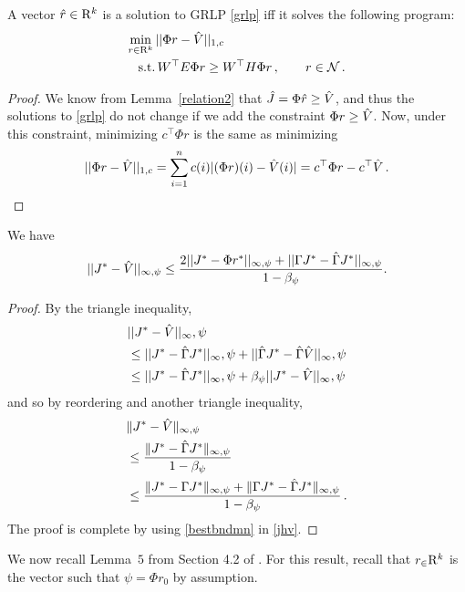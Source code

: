 \begin{lemma}\label{srw}
A vector
$\hat{r} \in \mathrm{R}^k$ is a solution to GRLP \eqref{grlp} iff it solves the following program:
\begin{align}\label{grlpeqprog}
\begin{split}
\min_{r\in \R^k}\, &||\Phi r-\hv||_{1,c}\\
\text{s.t.}\mb &\, W^\top E \Phi r\geq W^\top H \Phi r\,, \qquad r\in \N\,.
\end{split}
\end{align}
\end{lemma}
\begin{proof}
We know from Lemma~\ref{relation2} that $\hat{J} = \Phi \hat{r} \geq\hat{V}$, and thus
the solutions to \eqref{grlp} do not change if we add the constraint $\Phi r \ge \hat{V}$.
Now, under this constraint, minimizing $c^\top \Phi r$ is the same as minimizing 
\begin{align*}
||\Phi r-\hat{V}||_{1,c}=\sum_{i=1}^n c(i) |(\Phi r)(i)-\hat{V}(i)|=c^\top \Phi r-c^\top \hat{V}\,.
\end{align*} 
\end{proof}
\begin{lemma}\label{cmt1mn}
We have
\begin{align}
||J^*-\hat{V}||_{\infty,\psi}\leq \frac{2||J^*-\Phi r^*||_{\infty,\psi}+||\Gamma J^*-\hat{\Gamma} J^*||_{\infty,\psi}}{1-\beta_{\psi}}.
\end{align}
\end{lemma}
\begin{proof}
By the triangle inequality,
\begin{align*}
&||J^*-\hat{V}||_\infty,\psi\\&\leq ||J^*-\hat{\Gamma} J^*||_\infty,\psi+||\hat{\Gamma} J^*-\hat{\Gamma} \hat{V}||_\infty,\psi\\&\leq ||J^*-\hat{\Gamma} J^*||_\infty,\psi+\beta_\psi || J^*- \hat{V}||_\infty,\psi
\end{align*}
and so by reordering and another triangle inequality,
\begin{align}\label{jhv}
&\norm{J^*-\hv}_{\mn} \\&\le \frac{\norm{ J^*-\hg J^*}_{\mn}}{1-\beta_\psi}\\
&\le \frac{\norm{ J^*-\Gamma J^*}_{\mn}+\norm{\Gamma J^* - \hg J^*}_{\mn}}{1-\beta_\psi}\,.
\end{align}
The proof is complete by using \cref{bestbndmn} in \eqref{jhv}.
\end{proof}
We now recall Lemma~$5$ from Section 4.2 of \cite{ALP}. 
For this result, recall that $r_\in \mathrm{R}^k$ is the vector such that $\psi = \Phi r_0$ by assumption.
